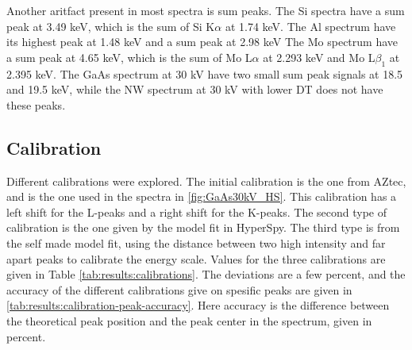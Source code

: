 Another aritfact present in most spectra is sum peaks.
The Si spectra have a sum peak at 3.49 keV, which is the sum of Si K$\alpha$ at 1.74 keV. %
The Al spectrum have its highest peak at 1.48 keV and a sum peak at 2.98 keV
The Mo spectrum have a sum peak at 4.65 keV, which is the sum of Mo L$\alpha$ at 2.293 keV and Mo L$\beta_1$ at 2.395 keV. %
The GaAs spectrum at 30 kV have two small sum peak signals at 18.5 and 19.5 keV, while the NW spectrum at 30 kV with lower DT does not have these peaks. %






\subsection{Calibration}
\label{sec:results:qualitative:calibration}

Different calibrations were explored.
The initial calibration is the one from AZtec, and is the one used in the spectra in \cref{fig:GaAs30kV_HS}.
This calibration has a left shift for the L-peaks and a right shift for the K-peaks.
The second type of calibration is the one given by the model fit in HyperSpy.
The third type is from the self made model fit, using the distance between two high intensity and far apart peaks to calibrate the energy scale.
Values for the three calibrations are given in Table \ref{tab:results:calibrations}.
The deviations are a few percent, and the accuracy of the different calibrations give on spesific peaks are given in \cref{tab:results:calibration-peak-accuracy}.
Here accuracy is the difference between the theoretical peak position and the peak center in the spectrum, given in percent.

